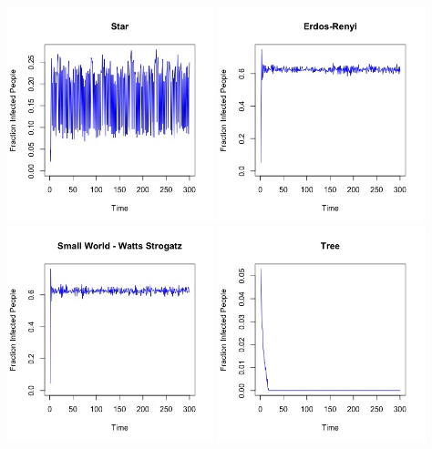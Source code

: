 \documentclass{article}
\begin{document}
\begin{center}
   
    
    \includegraphics[width=6cm]{star.jpeg}
    \includegraphics[width=6cm]{erdos_renyi.jpeg}
    \includegraphics[width=6cm]{watts_strogatz.jpeg}
    \includegraphics[width=6cm]{tree.jpeg}

\end{center}
\end{document}
